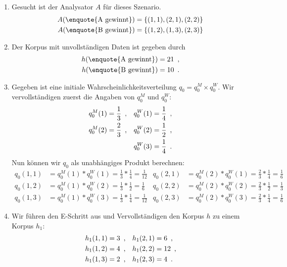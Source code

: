 \documentclass[ngerman, a4paper, 12pt]{article}
\newcommand{\satzende}{\enskip \text{.}}
\newcommand{\komma}{\enskip \text{,}}
\begin{document}
	\begin{enumerate}[label=\textbf{(\alph*)}, leftmargin=0pt]
		\item Gesucht ist der Analysator $A$ für dieses Szenario.
		\begin{align*}
			A( \text{\enquote{A gewinnt}}) &= \menge{(1,1), (2,1), (2,2)} \\
			A( \text{\enquote{B gewinnt}}) &= \menge{(1,2), (1,3), (2,3)}			
		\end{align*}
		\item Der Korpus mit unvollständigen Daten ist gegeben durch
		\begin{align*}
			h(\text{\enquote{A gewinnt}}) &= 21 \komma \\
			h(\text{\enquote{B gewinnt}}) &= 10 \satzende
 		\end{align*}
 		\item Gegeben ist eine initiale Wahrscheinlichkeitsverteilung $q_0 = q_0^M \times q_0^W$. Wir vervollständigen zuerst die Angaben von $q_0^M$ und $q_0^W$:
 		\begin{align*}
 			q_0^M(1) &= \frac{1}{3} \komma & q_0^W(1) = \frac{1}{4} \komma \\
 			q_0^M(2) &= \frac{2}{3} \komma & q_0^W(2) = \frac{1}{2} \komma \\
 			 		 &                     & q_0^W(3) = \frac{1}{4} \satzende 
 		\end{align*}
 		Nun können wir $q_0$ als unabhängiges Produkt berechnen:
 		\begin{align*}
 			q_0(1,1) &= q_0^M(1) * q_0^W(1) = \frac{1}{3} * \frac{1}{4} = \frac{1}{12} &
 			q_0(2,1) &= q_0^M(2) * q_0^W(1) = \frac{2}{3} * \frac{1}{4} = \frac{1}{6} \\
 			q_0(1,2) &= q_0^M(1) * q_0^W(2) = \frac{1}{3} * \frac{1}{2} = \frac{1}{6} &
 			q_0(2,2) &= q_0^M(2) * q_0^W(2) = \frac{2}{3} * \frac{1}{2} = \frac{1}{3} \\
 			q_0(1,3) &= q_0^M(1) * q_0^W(3) = \frac{1}{3} * \frac{1}{4} = \frac{1}{12} &
 			q_0(2,3) &= q_0^M(2) * q_0^W(3) = \frac{2}{3} * \frac{1}{4} = \frac{1}{6}
 		\end{align*}
 		\item Wir führen den E-Schritt aus und Vervollständigen den Korpus $h$ zu einem Korpus $h_1$:
 		\begin{align*}
 			h_1(1,1) &= 3 \komma & h_1(2,1) &= 6  \komma \\
 			h_1(1,2) &= 4 \komma & h_1(2,2) &= 12 \komma \\
 			h_1(1,3) &= 2 \komma & h_1(2,3) &= 4  \satzende

\end{align*}
\end{enumerate}
\end{document}
